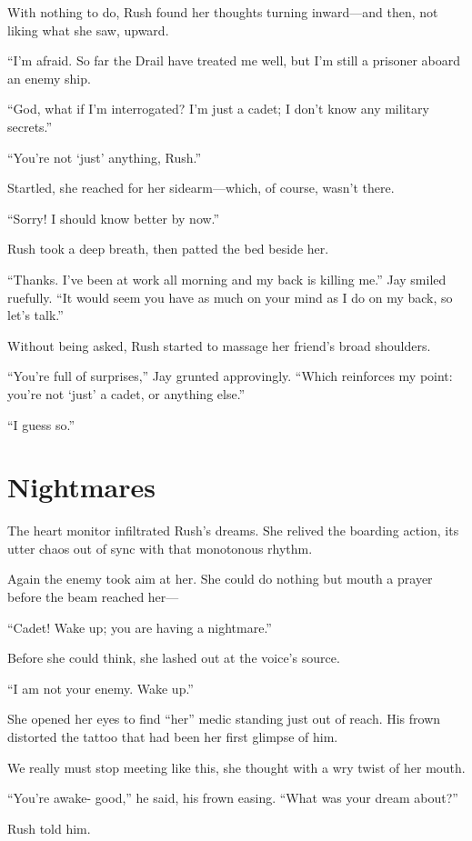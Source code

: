\documentclass{book}
\begin{document}
With nothing to do, Rush found her thoughts turning inward---and then, not liking what she saw, upward.

``I'm afraid. So far the Drail have treated me well, but I'm still a prisoner aboard an enemy ship.

``God, what if I'm interrogated? I'm just a cadet; I don't know any military secrets.''

``You're not `just' anything, Rush.''

Startled, she reached for her sidearm---which, of course, wasn't there.

``Sorry! I should know better by now.''

Rush took a deep breath, then patted the bed beside her.

``Thanks. I've been at work all morning and my back is killing me.'' Jay smiled ruefully. ``It would seem you have as much on your mind as I do 
on my back, so let's talk.''

Without being asked, Rush started to massage her friend's broad shoulders.

``You're full of surprises,'' Jay grunted approvingly. ``Which reinforces my point: you're not `just' a cadet, or anything else.''

``I guess so.''

\section{Nightmares}
The heart monitor infiltrated Rush's dreams. She relived the boarding action, its utter chaos out of sync with that monotonous rhythm.

Again the enemy took aim at her. She could do nothing but mouth a prayer before the beam reached her---

``Cadet! Wake up; you are having a nightmare.''

Before she could think, she lashed out at the voice's source.

``I am not your enemy. Wake up.''

She opened her eyes to find ``her'' medic standing just out of reach. His frown distorted the tattoo that had been her first glimpse of him.

We really must stop meeting like this, she thought with a wry twist of her mouth.

``You're awake- good,'' he said, his frown easing. ``What was your dream about?''

Rush told him.
\end{document}

